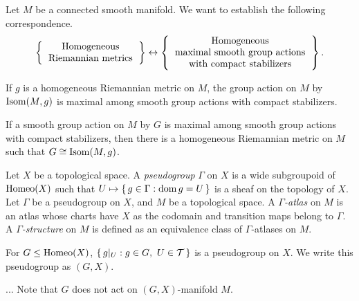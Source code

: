 \documentclass{../../large}
\begin{document}
\begin{prb}
Let $M$ be a connected smooth manifold.
We want to establish the following correspondence.
\[\left\{\begin{tabular}{c}Homogeneous\\Riemannian metrics\end{tabular}\right\}\leftrightarrow\left\{\begin{tabular}{c}Homogeneous\\maximal smooth group actions\\with compact stabilizers\end{tabular}\right\}.\]
\begin{parts}
\item If $g$ is a homogeneous Riemannian metric on $M$, the group action on $M$ by $\operatorname{Isom}(M,g)$ is maximal among smooth group actions with compact stabilizers.
\item If a smooth group action on $M$ by $G$ is maximal among smooth group actions with compact stabilizers, then there is a homogeneous Riemannian metric on $M$ such that $G\cong\operatorname{Isom}(M,g)$.
\end{parts}
\end{prb}
\begin{pf}
\end{pf}

\begin{prb}
Let $X$ be a topological space.
A \emph{pseudogroup} $\Gamma$ on $X$ is a wide subgroupoid of $\operatorname{Homeo}(X)$ such that $U\mapsto\{\,g\in\Gamma:\operatorname{dom} g=U\,\}$ is a sheaf on the topology of $X$.
Let $\Gamma$ be a pseudogroup on $X$, and $M$ be a topological space.
A \emph{$\Gamma$-atlas} on $M$ is an atlas whose charts have $X$ as the codomain and transition maps belong to $\Gamma$.
A \emph{$\Gamma$-structure} on $M$ is defined as an equivalence class of $\Gamma$-atlases on $M$.
\begin{parts}
\item For $G\le\operatorname{Homeo}(X)$, $\{\,g|_U:g\in G,\ U\in\mathcal{T}\,\}$ is a pseudogroup on $X$. We write this pseudogroup as $(G,X)$.
\item...
Note that $G$ does not act on $(G,X)$-manifold $M$.
\end{parts}
\end{prb}
\end{document}
